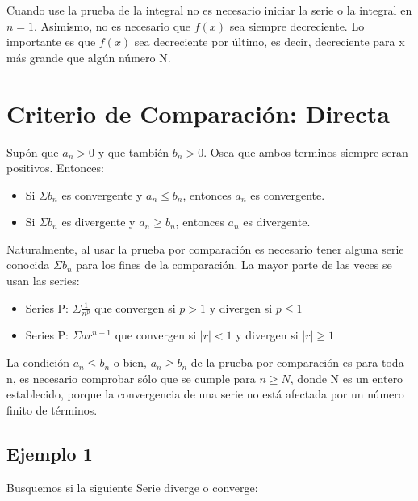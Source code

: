 \documentclass[12pt]{report}							    %
\begin{document}
        Cuando use la prueba de la integral no es necesario iniciar la serie o la integral en $n=1$.
        Asimismo, no es necesario que $f(x)$ sea siempre decreciente.
        Lo importante es que $f(x)$ sea decreciente por último, es decir, decreciente para x más
        grande que algún número N. 



    \clearpage
    \section{Criterio de Comparación: Directa}

        Supón que $a _n > 0$ y que también $b_n > 0$. Osea que ambos terminos siempre seran positivos.
        Entonces:

        \begin{itemize}
            \item Si $\Sigma b_n$ es convergente y $a_n \leq b_n$, entonces $a_n$ es convergente. 
            \item Si $\Sigma b_n$ es divergente y $a_n \geq b_n$, entonces $a_n$ es divergente. 
        \end{itemize}

        Naturalmente, al usar la prueba por comparación es necesario tener alguna serie conocida $\Sigma b_n$
        para los fines de la comparación. La mayor parte de las veces se usan las series:

        \begin{itemize}
            \item Series P: $\Sigma \frac{1}{n^p}$ que convergen si $p>1$ y divergen si $p\leq 1$
            \item Series P: $\Sigma ar^{n-1}$ que convergen si $|r|<1$ y divergen si $|r|\geq 1$
        \end{itemize}

        La condición $a_n \leq b_n$ o bien, $a_n \geq b_n$ de la prueba por comparación es para toda n, es
        necesario comprobar sólo que se cumple para $n \geq N$, donde N es un entero establecido, porque
        la convergencia de una serie no está afectada por un número finito de términos.

        \subsection{Ejemplo 1}
        Busquemos si la siguiente Serie diverge o converge:
\end{document}
